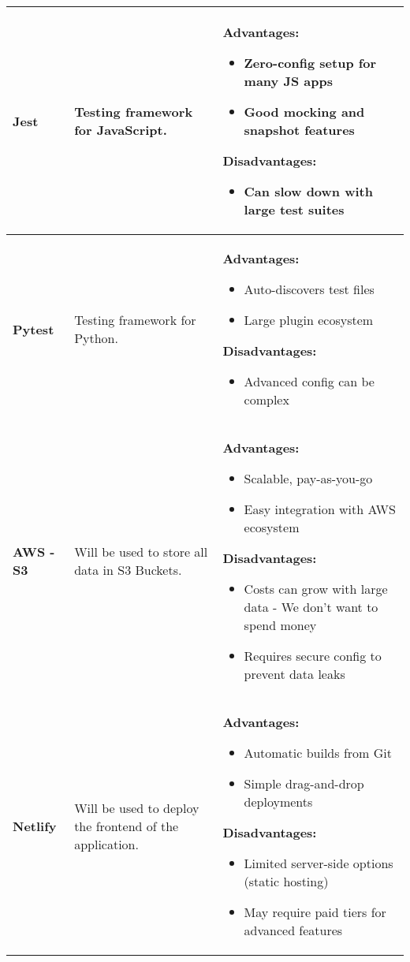\documentclass{article}
\begin{document}
\begin{table}[htbp]
\begin{tabularx}{\textwidth}{p{2cm} p{4cm} X}
  \textbf{Jest} 
  & Testing framework for JavaScript.
  & \textbf{Advantages:}
    \begin{itemize}
      \item Zero-config setup for many JS apps
      \item Good mocking and snapshot features
    \end{itemize}
    \textbf{Disadvantages:}
    \begin{itemize}
      \item Can slow down with large test suites
    \end{itemize}
  \\
  \midrule

  \textbf{Pytest} 
  & Testing framework for Python.
  & \textbf{Advantages:}
    \begin{itemize}
      \item Auto-discovers test files
      \item Large plugin ecosystem
    \end{itemize}
    \textbf{Disadvantages:}
    \begin{itemize}
      \item Advanced config can be complex
    \end{itemize}
  \\
  \midrule

  \textbf{AWS - S3} 
  & Will be used to store all data in S3 Buckets.
  & \textbf{Advantages:}
    \begin{itemize}
      \item Scalable, pay-as-you-go
      \item Easy integration with AWS ecosystem
    \end{itemize}
    \textbf{Disadvantages:}
    \begin{itemize}
      \item Costs can grow with large data - We don't want to spend money
      \item Requires secure config to prevent data leaks
    \end{itemize}
  \\
  \midrule

  \textbf{Netlify} 
  & Will be used to deploy the frontend of the application.
  & \textbf{Advantages:}
    \begin{itemize}
      \item Automatic builds from Git
      \item Simple drag-and-drop deployments
    \end{itemize}
    \textbf{Disadvantages:}
    \begin{itemize}
      \item Limited server-side options (static hosting)
      \item May require paid tiers for advanced features
    \end{itemize}
  \\
  \midrule


\end{tabularx}
\end{table}
\end{document}
